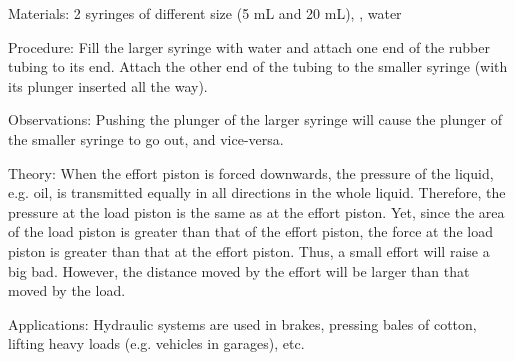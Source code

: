 \begin{multicols}{2}
\begin{description*}
\item[Materials:]{2 syringes of different size (5 mL and 20 mL), , water}
\item[Procedure:]{Fill the larger syringe with water and attach one end of the rubber tubing to its end. Attach the other end of the tubing to the smaller syringe (with its plunger inserted all the way).}
\item[Observations:]{Pushing the plunger of the larger syringe will cause the plunger of the smaller syringe to go out, and vice-versa.}
\item[Theory:]{When the effort piston is forced downwards, the pressure of the liquid, e.g. oil, is transmitted
equally in all directions in the whole liquid.
Therefore, the pressure at the load piston is the same as at the effort piston. Yet,
since the area of the load piston is greater than that of the effort
piston, the force at the load piston is greater than that at the effort piston. Thus, a small effort
will raise a big bad. However, the distance moved by the effort will be larger than that moved
by the load.}
\item[Applications:]{Hydraulic systems are used in brakes, pressing bales of cotton, lifting heavy loads (e.g.
vehicles in garages), etc.}
\end{description*}



\end{multicols}

\pagebreak